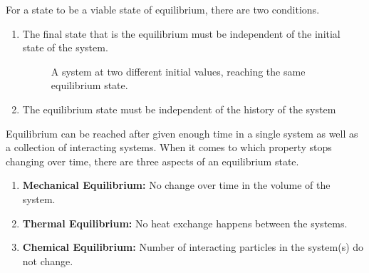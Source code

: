     For a state to be a viable state of equilibrium, there are two conditions.
    \begin{enumerate}
        \item The final state that is the equilibrium must be independent of the initial state of the system.
            \begin{figure}[H]
                \centering
                \caption{A system at two different initial values, reaching the same equilibrium state.}
                \label{fig:equilibrium}
            \end{figure}
            
        \item The equilibrium state must be independent of the history of the system
    \end{enumerate}
    Equilibrium can be reached after given enough time in a single system as well as a collection of interacting systems. When it comes to which property stops changing over time, there are three aspects of an equilibrium state.
    \begin{enumerate}
        \item \textbf{Mechanical Equilibrium:} No change over time in the volume of the system.
        \item \textbf{Thermal Equilibrium:} No heat exchange happens between the systems.
        \item \textbf{Chemical Equilibrium:} Number of interacting particles in the system(s) do not change.
    \end{enumerate}
